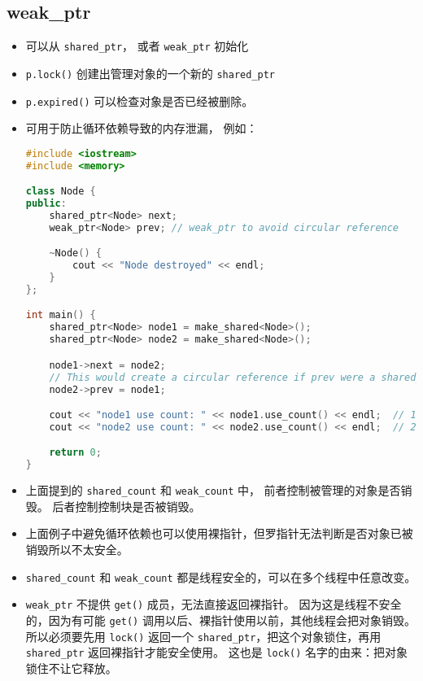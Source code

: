 \subsection{weak\_ptr}
\begin{itemize}
\item 可以从 \verb`shared_ptr`， 或者 \verb`weak_ptr` 初始化
\item \verb`p.lock()` 创建出管理对象的一个新的 \verb`shared_ptr`
\item \verb`p.expired()` 可以检查对象是否已经被删除。
\item 可用于防止循环依赖导致的内存泄漏， 例如：
\begin{lstlisting}[language=cpp]
#include <iostream>
#include <memory>

class Node {
public:
    shared_ptr<Node> next;
    weak_ptr<Node> prev; // weak_ptr to avoid circular reference

    ~Node() {
        cout << "Node destroyed" << endl;
    }
};

int main() {
    shared_ptr<Node> node1 = make_shared<Node>();
    shared_ptr<Node> node2 = make_shared<Node>();

    node1->next = node2;
    // This would create a circular reference if prev were a shared_ptr
    node2->prev = node1;

    cout << "node1 use count: " << node1.use_count() << endl;  // 1
    cout << "node2 use count: " << node2.use_count() << endl;  // 2

    return 0;
}
\end{lstlisting}
\item 上面提到的 \verb`shared_count` 和 \verb`weak_count` 中， 前者控制被管理的对象是否销毁。 后者控制控制块是否被销毁。
\item 上面例子中避免循环依赖也可以使用裸指针，但罗指针无法判断是否对象已被销毁所以不太安全。
\item \verb`shared_count` 和 \verb`weak_count` 都是线程安全的，可以在多个线程中任意改变。
\item \verb`weak_ptr` 不提供 \verb`get()` 成员，无法直接返回裸指针。 因为这是线程不安全的，因为有可能 \verb`get()` 调用以后、裸指针使用以前，其他线程会把对象销毁。 所以必须要先用 \verb`lock()` 返回一个 \verb`shared_ptr`，把这个对象锁住，再用 \verb`shared_ptr` 返回裸指针才能安全使用。 这也是 \verb`lock()` 名字的由来：把对象锁住不让它释放。
\end{itemize}
